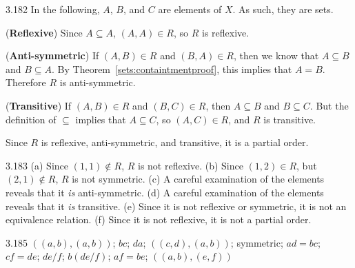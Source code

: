 \begin{Answer}{3.182}
In the following, $A$, $B$, and $C$ are elements of $X$.  As such, they are sets.

\noindent
({\bf Reflexive})
Since $A\subseteq A$, $(A,A)\in R$, so $R$ is reflexive.

\noindent
({\bf Anti-symmetric})
If $(A,B)\in R$ and $(B,A)\in R$, then we know that
$A\subseteq B$ and $B\subseteq A$.  By Theorem~\ref{sets:containtmentproof}, this implies
that $A=B$.  Therefore $R$ is anti-symmetric.

\noindent
({\bf Transitive})
If $(A,B)\in R$ and $(B,C)\in R$, then $A\subseteq B$ and $B\subseteq C$.  But the definition
of $\subseteq$ implies that $A\subseteq C$, so $(A,C)\in R$, and $R$ is transitive.

\noindent
Since $R$ is reflexive, anti-symmetric, and transitive, it is a partial order.
\end{Answer}
\begin{Answer}{3.183}
(a) Since $(1,1)\not\in R$, $R$ is not reflexive.
(b) Since $(1,2)\in R$, but $(2,1)\not\in R$, $R$ is not symmetric.
(c) A careful examination of the elements reveals that it {\em is} anti-symmetric.
(d) A careful examination of the elements reveals that it {\em is} transitive.
(e) Since it is not reflexive or symmetric, it is not an equivalence relation.
(f) Since it is not reflexive, it is not a partial order.
\end{Answer}
\begin{Answer}{3.185}
$( (a,b), (a,b))$;
$bc$;
$da$;
$((c,d),(a,b))$;
symmetric;
$ad=bc$;
$cf=de$;
$de/f$;
$b(de/f)$;
$af=be$;
$( (a,b),(e,f) )$
\end{Answer}
